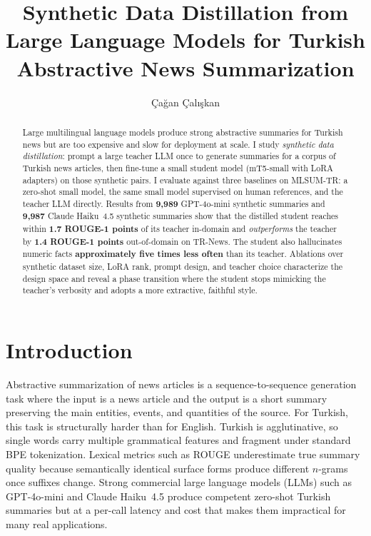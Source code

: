 \documentclass{llncs}
\begin{document}
\sloppy

\title{Synthetic Data Distillation from Large Language Models for Turkish Abstractive News Summarization}


\author{Çağan Çalışkan}



\maketitle

\begin{abstract}
Large multilingual language models produce strong abstractive summaries for Turkish news but are too expensive and slow for deployment at scale. I study \emph{synthetic data distillation}: prompt a large teacher LLM once to generate summaries for a corpus of Turkish news articles, then fine-tune a small student model (mT5-small with LoRA adapters) on those synthetic pairs. I evaluate against three baselines on MLSUM-TR: a zero-shot small model, the same small model supervised on human references, and the teacher LLM directly. Results from \textbf{9{,}989} GPT-4o-mini synthetic summaries and \textbf{9{,}987} Claude Haiku~4.5 synthetic summaries show that the distilled student reaches within \textbf{1.7 ROUGE-1 points} of its teacher in-domain and \emph{outperforms} the teacher by \textbf{1.4 ROUGE-1 points} out-of-domain on TR-News. The student also hallucinates numeric facts \textbf{approximately five times less often} than its teacher. Ablations over synthetic dataset size, LoRA rank, prompt design, and teacher choice characterize the design space and reveal a phase transition where the student stops mimicking the teacher's verbosity and adopts a more extractive, faithful style.
\end{abstract}

\section{Introduction}

Abstractive summarization of news articles is a sequence-to-sequence generation task where the input is a news article and the output is a short summary preserving the main entities, events, and quantities of the source. For Turkish, this task is structurally harder than for English. Turkish is agglutinative, so single words carry multiple grammatical features and fragment under standard BPE tokenization. Lexical metrics such as ROUGE underestimate true summary quality because semantically identical surface forms produce different $n$-grams once suffixes change. Strong commercial large language models (LLMs) such as GPT-4o-mini and Claude Haiku~4.5 produce competent zero-shot Turkish summaries but at a per-call latency and cost that makes them impractical for many real applications.
\end{document}
